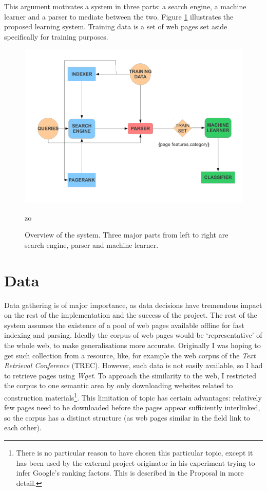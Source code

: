 \documentclass[12pt,notitlepage,twoside]{scrreprt}
\begin{document}
This argument motivates a system in three parts: a search engine, a machine
learner and a parser to mediate between the two.  Figure \ref{overview}
illustrates the proposed learning system. Training data is a set of web pages
set aside specifically for training purposes.  

\begin{figure}
\centering
\includegraphics[scale=0.5]{figs/overview.pdf}
\caption{Overview of the system. Three major parts from left to right are search engine,
parser and machine learner.}
zo\label{overview}

\end{figure}

\section{Data}
Data gathering is of major importance, as data decisions have tremendous impact
on the rest of the implementation and the success of the project. The rest of
the system assumes the existence of a pool of web pages available offline for
fast indexing and parsing. Ideally the corpus of web pages would be
`representative' of the whole web, to make generalisations more accurate.
Originally I was hoping to get such collection from a resource, like, for
example the web corpus of the \textit{Text Retrieval Conference} (TREC). However,
such data is not easily available, so I had to retrieve pages using
\textit{Wget}. To approach the similarity to the web, I restricted the corpus
to one semantic area by only downloading websites related to construction
materials\footnote{There is no particular reason to have chosen this particular
topic, except it has been used by the external project originator in his
experiment trying to infer Google's ranking factors. This is described in the
Proposal in more detail.}. This limitation of topic has certain advantages:
relatively few pages need to be  downloaded before the pages appear
sufficiently interlinked, so the corpus has a distinct structure (as web pages
similar in the field link to each other).
\end{document}
